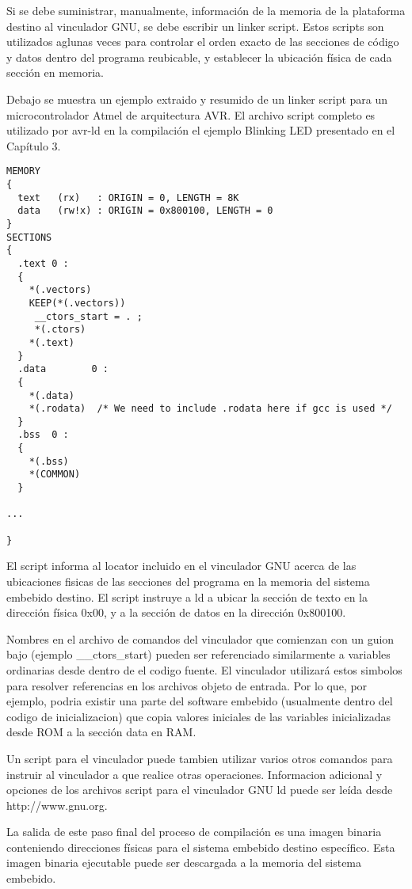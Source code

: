 \documentclass[12pt]{article}
\begin{document}
Si se debe suministrar, manualmente, información de la memoria de la plataforma destino
al vinculador  GNU, se debe escribir un linker script.
Estos scripts son utilizados aglunas veces para controlar el orden exacto de
las secciones de código y datos dentro del programa reubicable, y establecer
la ubicación física de cada sección en memoria.


Debajo se muestra un ejemplo extraido y resumido de un linker script
para un microcontrolador Atmel de arquitectura AVR. El archivo script
completo es utilizado por avr-ld en la compilación el ejemplo Blinking LED
presentado en el Capítulo 3.

\begin{verbatim}
MEMORY
{
  text   (rx)   : ORIGIN = 0, LENGTH = 8K
  data   (rw!x) : ORIGIN = 0x800100, LENGTH = 0
}
SECTIONS
{
  .text 0 :
  {
    *(.vectors)
    KEEP(*(.vectors))
     __ctors_start = . ;
     *(.ctors)
    *(.text)
  }
  .data        0 :
  {
    *(.data)
    *(.rodata)  /* We need to include .rodata here if gcc is used */
  }
  .bss  0 :
  {
    *(.bss)
    *(COMMON)
  }

...

}
\end{verbatim}

El script informa al locator incluido en el vinculador GNU acerca de las ubicaciones
fisicas de las secciones del programa en la memoria del sistema embebido destino.
El script instruye a ld a ubicar la sección de texto en la dirección física 0x00,
y a la sección de datos en la dirección 0x800100.

Nombres en el archivo de comandos del vinculador que comienzan con un guion bajo
(ejemplo \_\_ctors\_start) pueden ser referenciado similarmente a variables ordinarias
desde dentro de el codigo fuente. El vinculador utilizará estos simbolos
para resolver referencias en los archivos objeto de entrada.
Por lo que, por ejemplo, podria existir una parte del software embebido (usualmente
dentro del codigo de inicializacion) que copia valores iniciales de las variables
inicializadas desde ROM a la sección data en RAM.

Un script para el vinculador puede tambien utilizar varios otros comandos
para instruir al vinculador a que realice otras operaciones.
Informacion adicional y opciones de los archivos script para el vinculador GNU ld
puede ser leída desde http://www.gnu.org.

La salida de este paso final del proceso de compilación es una imagen binaria
conteniendo direcciones físicas para el sistema embebido destino específico.
Esta imagen binaria ejecutable puede ser descargada a la memoria del sistema embebido.
\end{document}
